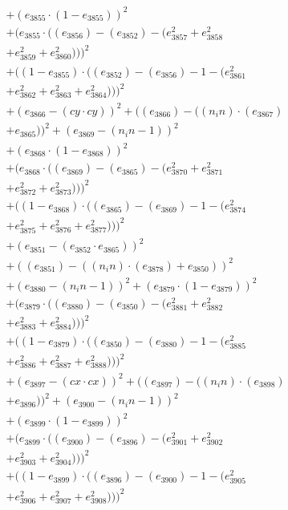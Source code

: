 \documentclass[10pt, a4paper]{article}
\begin{document}
\begin{small}
\begin{align*}
& + (e_{3855}  \cdot  (1 - e_{3855}))^{2} \\
& + (e_{3855}  \cdot  ((e_{3856}) - (e_{3852}) - (e_{3857}^{2} + e_{3858}^{2} \\
& + e_{3859}^{2} + e_{3860}^{2})))^{2} \\
& + ((1 - e_{3855})  \cdot  ((e_{3852}) - (e_{3856}) - 1 - (e_{3861}^{2} \\
& + e_{3862}^{2} + e_{3863}^{2} + e_{3864}^{2})))^{2} \\
& + (e_{3866} - (cy  \cdot  cy))^{2} + ((e_{3866}) - ((n_in)  \cdot  (e_{3867}) \\
& + e_{3865}))^{2} + (e_{3869} - (n_in - 1))^{2} \\
& + (e_{3868}  \cdot  (1 - e_{3868}))^{2} \\
& + (e_{3868}  \cdot  ((e_{3869}) - (e_{3865}) - (e_{3870}^{2} + e_{3871}^{2} \\
& + e_{3872}^{2} + e_{3873}^{2})))^{2} \\
& + ((1 - e_{3868})  \cdot  ((e_{3865}) - (e_{3869}) - 1 - (e_{3874}^{2} \\
& + e_{3875}^{2} + e_{3876}^{2} + e_{3877}^{2})))^{2} \\
& + (e_{3851} - (e_{3852}  \cdot  e_{3865}))^{2} \\
& + ((e_{3851}) - ((n_in)  \cdot  (e_{3878}) + e_{3850}))^{2} \\
& + (e_{3880} - (n_in - 1))^{2} + (e_{3879}  \cdot  (1 - e_{3879}))^{2} \\
& + (e_{3879}  \cdot  ((e_{3880}) - (e_{3850}) - (e_{3881}^{2} + e_{3882}^{2} \\
& + e_{3883}^{2} + e_{3884}^{2})))^{2} \\
& + ((1 - e_{3879})  \cdot  ((e_{3850}) - (e_{3880}) - 1 - (e_{3885}^{2} \\
& + e_{3886}^{2} + e_{3887}^{2} + e_{3888}^{2})))^{2} \\
& + (e_{3897} - (cx  \cdot  cx))^{2} + ((e_{3897}) - ((n_in)  \cdot  (e_{3898}) \\
& + e_{3896}))^{2} + (e_{3900} - (n_in - 1))^{2} \\
& + (e_{3899}  \cdot  (1 - e_{3899}))^{2} \\
& + (e_{3899}  \cdot  ((e_{3900}) - (e_{3896}) - (e_{3901}^{2} + e_{3902}^{2} \\
& + e_{3903}^{2} + e_{3904}^{2})))^{2} \\
& + ((1 - e_{3899})  \cdot  ((e_{3896}) - (e_{3900}) - 1 - (e_{3905}^{2} \\
& + e_{3906}^{2} + e_{3907}^{2} + e_{3908}^{2})))^{2} \\

\end{align*}
\end{small}
\end{document}
